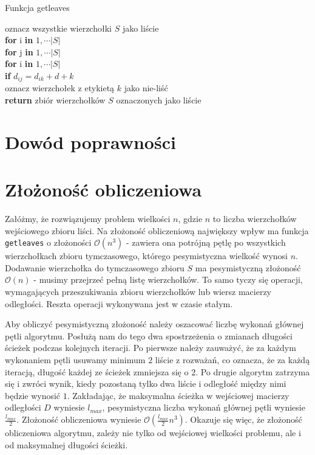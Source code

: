 \documentclass[a4paper,12p]{article}
\newcommand\tab[1][1cm]{\hspace*{#1}}
\begin{document}
\begin{algorithm}
		\caption{Funkcja getleaves}
		\label{algo}
		oznacz wszystkie wierzchołki $S$ jako liście \\
		\textbf{for} i \textbf{in} $1, \cdots |S|$ \\
		\tab \textbf{for} j \textbf{in} $1, \cdots |S|$ \\
		\tab \tab \textbf{for} i \textbf{in} $1, \cdots |S|$ \\
		\tab \tab \tab \textbf{if} $d_{ij} = d_{ik} + d+k$ \\
		\tab \tab \tab \tab oznacz wierzchołek z etykietą $k$ jako nie-liść \\
		\textbf{return} zbiór wierzchołków $S$ oznaczonych jako liście \\
\end{algorithm}

\section{Dowód poprawności}

\section{Złożoność obliczeniowa}

Załóżmy, że rozwiązujemy problem wielkości $n$, gdzie $n$ to liczba wierzchołków wejściowego zbioru liści. Na złożoność obliczeniową największy wpływ ma funkcja \texttt{getleaves} o złożoności $\mathcal{O}(n^3)$ - zawiera ona potrójną pętlę po wszystkich wierzchołkach zbioru tymczasowego, którego pesymistyczna wielkość wynosi $n$. Dodawanie wierzchołka do tymczasowego zbioru $S$ ma pesymistyczną złożoność $\mathcal{O}(n)$ - musimy przejrzeć pełną listę wierzchołków. To samo tyczy się operacji, wymagających przeszukiwania zbioru wierzchołków lub wiersz macierzy odległości. Reszta operacji wykonywana jest w czasie stałym.

Aby obliczyć pesymistyczną złożoność należy oszacować liczbę wykonań głównej pętli algorytmu. Posłużą nam do tego dwa spostrzeżenia o zmianach długości ścieżek podczas kolejnych iteracji. Po pierwsze należy zauważyć, że za każdym wykonaniem pętli usuwamy minimum $2$ liście z rozważań, co oznacza, że za każdą iteracją, długość każdej ze ścieżek zmniejsza się o $2$. Po drugie algorytm zatrzyma się i zwróci wynik, kiedy pozostaną tylko dwa liście i odległość między nimi będzie wynosić $1$. Zakładając, że maksymalna ścieżka w wejściowej macierzy odległości $D$ wyniesie $l_{max}$, pesymistyczna liczba wykonań głównej pętli wyniesie $\frac{l_{max}}{2}$. Złożoność obliczeniowa wyniesie $\mathcal{O}(\frac{l_{max}}{2} n^3)$. Okazuje się więc, że złożoność obliczeniowa algorytmu, zależy nie tylko od wejściowej wielkości problemu, ale i od maksymalnej długości ścieżki.

\newpage

\begin{thebibliography}{}

\end{thebibliography}
\end{document}
